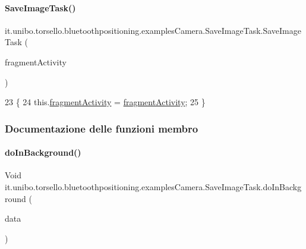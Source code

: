\paragraph{\texorpdfstring{Save\+Image\+Task()}{SaveImageTask()}}
{\footnotesize\ttfamily it.\+unibo.\+torsello.\+bluetoothpositioning.\+examples\+Camera.\+Save\+Image\+Task.\+Save\+Image\+Task (\begin{DoxyParamCaption}\item[{Fragment\+Activity}]{fragment\+Activity }\end{DoxyParamCaption})}


\begin{DoxyCode}
23                                                             \{
24         this.\hyperlink{classit_1_1unibo_1_1torsello_1_1bluetoothpositioning_1_1examplesCamera_1_1SaveImageTask_a020c67ae36b7f908c900da193d9cd110_a020c67ae36b7f908c900da193d9cd110}{fragmentActivity} = \hyperlink{classit_1_1unibo_1_1torsello_1_1bluetoothpositioning_1_1examplesCamera_1_1SaveImageTask_a020c67ae36b7f908c900da193d9cd110_a020c67ae36b7f908c900da193d9cd110}{fragmentActivity};
25     \}
\end{DoxyCode}


\subsubsection{Documentazione delle funzioni membro}
\hypertarget{classit_1_1unibo_1_1torsello_1_1bluetoothpositioning_1_1examplesCamera_1_1SaveImageTask_ae71e769fead7e2ec11d99922e03a14d9_ae71e769fead7e2ec11d99922e03a14d9}{}\label{classit_1_1unibo_1_1torsello_1_1bluetoothpositioning_1_1examplesCamera_1_1SaveImageTask_ae71e769fead7e2ec11d99922e03a14d9_ae71e769fead7e2ec11d99922e03a14d9} 
\paragraph{\texorpdfstring{do\+In\+Background()}{doInBackground()}}
{\footnotesize\ttfamily Void it.\+unibo.\+torsello.\+bluetoothpositioning.\+examples\+Camera.\+Save\+Image\+Task.\+do\+In\+Background (\begin{DoxyParamCaption}\item[{byte... \mbox{[}$\,$\mbox{]}}]{data }\end{DoxyParamCaption})\hspace{0.3cm}{\ttfamily [protected]}}


